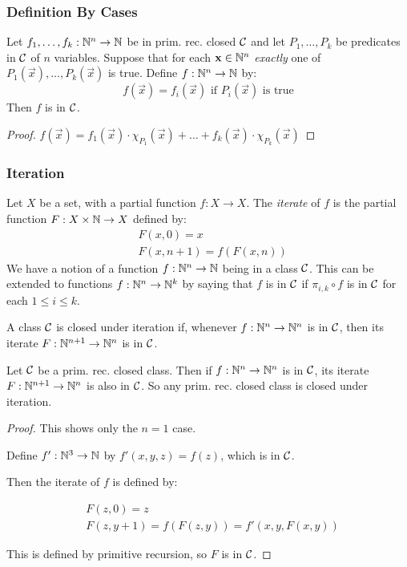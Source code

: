 \subsubsection{Definition By Cases}

Let $ f_1, \dots, f_k : \mathbb{N}^n \to \mathbb{N} $ be in  prim. rec. closed $ \mathcal{C} $ and let $ P_1, \dots, P_k $ be predicates in $ \mathcal{C} $ of $ n $ variables. Suppose that for each $ \mathbf{x} \in \mathbb{N}^n $ \textit{exactly} one of $ P_1(\vec{x}), \dots, P_k(\vec{x}) $ is true. Define $ f: \mathbb{N}^n \to \mathbb{N} $ by:
\begin{equation*}
f(\vec{x}) = f_i(\vec{x}) \text{ if } P_i(\vec{x}) \text{ is true}
\end{equation*}
Then $ f $ is in $ \mathcal{C} $.

\begin{proof}

$ f(\vec{x}) = f_1(\vec{x}) \cdot \chi_{P_1}(\vec{x}) + \dots + f_k(\vec{x}) \cdot \chi_{P_k}(\vec{x}) $

\end{proof}

\subsubsection{Iteration}

Let $ X $ be a set, with a partial function $ f: X \to X $. The \textit{iterate} of $ f $ is the partial function $ F: X \times \mathbb{N} \to X $ defined by:
\begin{align*}
&F(x, 0) = x\\
&F(x, n + 1) = f(F(x, n))
\end{align*}
We have a notion of a function $ f: \mathbb{N}^n \to \mathbb{N} $ being in a class $ \mathcal{C} $. This can be extended to functions $ f: \mathbb{N}^n \to \mathbb{N}^k $ by saying that $ f $ is in $ \mathcal{C} $ if $ \pi_{i, k} \circ f $ is in $ \mathcal{C} $ for each $ 1 \le i \le k $.

A class $ \mathcal{C} $ is closed under iteration if, whenever $ f: \mathbb{N}^n \to \mathbb{N}^n $ is in $ \mathcal{C} $, then its iterate $ F: \mathbb{N}^{n+1} \to \mathbb{N}^n $ is in $ \mathcal{C} $.

Let $ \mathcal{C} $ be a prim. rec. closed class. Then if $ f: \mathbb{N}^n \to \mathbb{N}^n $ is in $ \mathcal{C} $, its iterate $ F: \mathbb{N}^{n+1} \to \mathbb{N}^n $ is also in $ \mathcal{C} $. So any prim. rec. closed class is closed under iteration.

\begin{proof}

This shows only the $ n = 1 $ case.

Define $ f': \mathbb{N}^3 \to \mathbb{N} $ by $ f'(x, y, z) = f(z) $, which is in $ \mathcal{C} $.

Then the iterate of $ f $ is defined by:

\begin{align*}
&F(z, 0) = z\\
&F(z, y + 1) = f(F(z, y)) = f'(x, y, F(x, y))
\end{align*}

This is defined by primitive recursion, so $ F $ is in $ \mathcal{C} $.

\end{proof}

